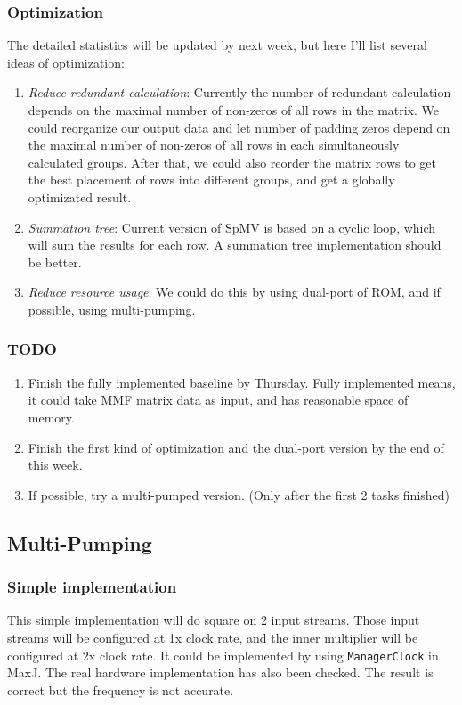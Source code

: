 \subsubsection{Optimization} The detailed statistics will be updated by next week, but here I'll list several ideas of optimization:
\begin{enumerate}
\item \textit{Reduce redundant calculation}: Currently the number of redundant calculation depends on the maximal number of non-zeros of all rows in the matrix. We could reorganize our output data and let number of padding zeros depend on the maximal number of non-zeros of all rows in each simultaneously calculated groups. After that, we could also reorder the matrix rows to get the best placement of rows into different groups, and get a globally optimizated result.
\item \textit{Summation tree}: Current version of SpMV is based on a cyclic loop, which will sum the results for each row. A summation tree implementation should be better.
\item \textit{Reduce resource usage}: We could do this by using dual-port of ROM, and if possible, using multi-pumping.
\end{enumerate}

\subsubsection{TODO} 
\begin{enumerate}
\item Finish the fully implemented baseline by Thursday. Fully implemented means, it could take MMF matrix data as input, and has reasonable space of memory.
\item Finish the first kind of optimization and the dual-port version by the end of this week.
\item If possible, try a multi-pumped version. (Only after the first 2 tasks finished)
\end{enumerate}

\subsection{Multi-Pumping}

\subsubsection{Simple implementation} This simple implementation will do square on 2 input streams. Those input streams will be configured at 1x clock rate, and the inner multiplier will be configured at 2x clock rate. It could be implemented by using \texttt{ManagerClock} in MaxJ. The real hardware implementation has also been checked. The result is correct but the frequency is not accurate.


